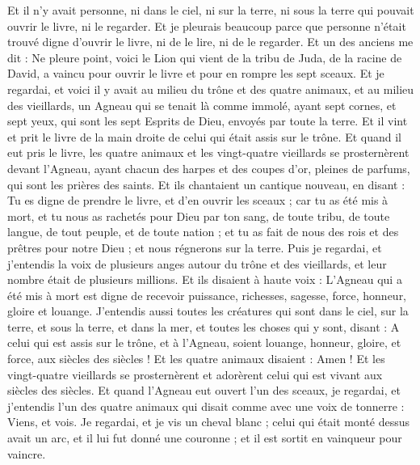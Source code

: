 \begin{multicols}{2}
Et il n'y avait personne, ni dans le ciel, ni sur la terre, ni sous la terre qui pouvait ouvrir le livre, ni le regarder.
Et je pleurais beaucoup parce que personne n'était trouvé digne d'ouvrir le livre, ni de le lire, ni de le regarder.
Et un des anciens me dit : Ne pleure point, voici le Lion qui vient de la tribu de Juda, de la racine de David, a vaincu pour ouvrir le livre et pour en rompre les sept sceaux.
Et je regardai, et voici il y avait au milieu du trône et des quatre animaux, et au milieu des vieillards, un Agneau qui se tenait là comme immolé, ayant sept cornes, et sept yeux, qui sont les sept Esprits de Dieu, envoyés par toute la terre.
Et il vint et prit le livre de la main droite de celui qui était assis sur le trône.
Et quand il eut pris le livre, les quatre animaux et les vingt-quatre vieillards se prosternèrent devant l'Agneau, ayant chacun des harpes et des coupes d'or, pleines de parfums, qui sont les prières des saints.
Et ils chantaient un cantique nouveau, en disant : Tu es digne de prendre le livre, et d'en ouvrir les sceaux ; car tu as été mis à mort, et tu nous as rachetés pour Dieu par ton sang, de toute tribu, de toute langue, de tout peuple, et de toute nation ;
et tu as fait de nous des rois et des prêtres pour notre Dieu ; et nous régnerons sur la terre.
Puis je regardai, et j'entendis la voix de plusieurs anges autour du trône et des vieillards, et leur nombre était de plusieurs millions.
Et ils disaient à haute voix : L'Agneau qui a été mis à mort est digne de recevoir puissance, richesses, sagesse, force, honneur, gloire et louange.
J'entendis aussi toutes les créatures qui sont dans le ciel, sur la terre, et sous la terre, et dans la mer, et toutes les choses qui y sont, disant : A celui qui est assis sur le trône, et à l'Agneau, soient louange, honneur, gloire, et force, aux siècles des siècles !
Et les quatre animaux disaient : Amen ! Et les vingt-quatre vieillards se prosternèrent et adorèrent celui qui est vivant aux siècles des siècles.
\VerseOne{}Et quand l'Agneau eut ouvert l'un des sceaux, je regardai, et j'entendis l'un des quatre animaux qui disait comme avec une voix de tonnerre : Viens, et vois.
Je regardai, et je vis un cheval blanc ; celui qui était monté dessus avait un arc, et il lui fut donné une couronne ; et il est sortit en vainqueur pour vaincre.

\end{multicols}
